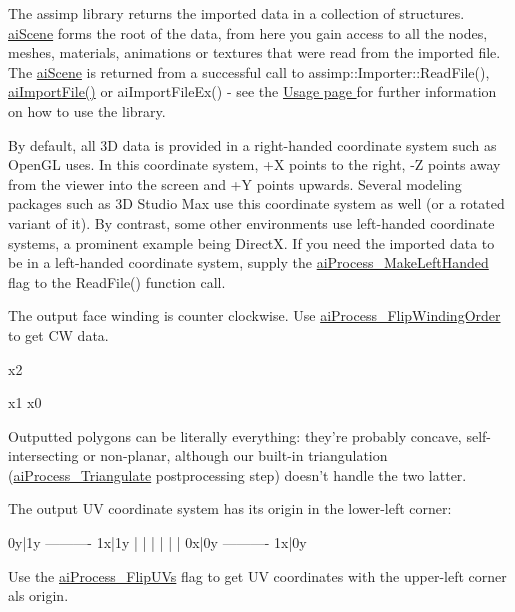 The assimp library returns the imported data in a collection of structures. \hyperlink{structai_scene}{ai\+Scene} forms the root of the data, from here you gain access to all the nodes, meshes, materials, animations or textures that were read from the imported file. The \hyperlink{structai_scene}{ai\+Scene} is returned from a successful call to assimp\+::\+Importer\+::\+Read\+File(), \hyperlink{_assimp_8cpp_a991846be600bc8a54f6878e5bca96907}{ai\+Import\+File()} or ai\+Import\+File\+Ex() -\/ see the \hyperlink{usage}{Usage page } for further information on how to use the library.

By default, all 3\+D data is provided in a right-\/handed coordinate system such as Open\+G\+L uses. In this coordinate system, +\+X points to the right, -\/\+Z points away from the viewer into the screen and +\+Y points upwards. Several modeling packages such as 3\+D Studio Max use this coordinate system as well (or a rotated variant of it). By contrast, some other environments use left-\/handed coordinate systems, a prominent example being Direct\+X. If you need the imported data to be in a left-\/handed coordinate system, supply the \hyperlink{postprocess_8h_a64795260b95f5a4b3f3dc1be4f52e410a133fd1162674e68bf8cd17070898a936}{ai\+Process\+\_\+\+Make\+Left\+Handed} flag to the Read\+File() function call.

The output face winding is counter clockwise. Use \hyperlink{postprocess_8h_a64795260b95f5a4b3f3dc1be4f52e410a429a11bf7ace46f039f55de895505d4a}{ai\+Process\+\_\+\+Flip\+Winding\+Order} to get C\+W data. 
\begin{DoxyCode}
x2
  
            x1
    x0
\end{DoxyCode}


Outputted polygons can be literally everything\+: they're probably concave, self-\/intersecting or non-\/planar, although our built-\/in triangulation (\hyperlink{postprocess_8h_a64795260b95f5a4b3f3dc1be4f52e410a9c3de834f0307f31fa2b1b6d05dd592b}{ai\+Process\+\_\+\+Triangulate} postprocessing step) doesn't handle the two latter.

The output U\+V coordinate system has its origin in the lower-\/left corner\+: 
\begin{DoxyCode}
0y|1y ---------- 1x|1y 
 |                |
 |                |
 |                |
0x|0y ---------- 1x|0y
\end{DoxyCode}
 Use the \hyperlink{postprocess_8h_a64795260b95f5a4b3f3dc1be4f52e410a06922b6a1f1cd8186f9fdafb471c813e}{ai\+Process\+\_\+\+Flip\+U\+Vs} flag to get U\+V coordinates with the upper-\/left corner als origin.

